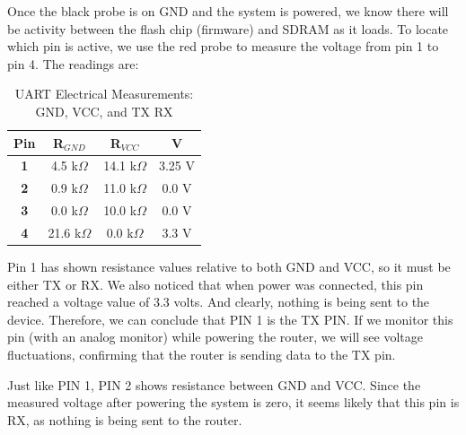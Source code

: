 \documentclass[12pt,a4paper, brazil]{article}
\begin{document}
Once the black probe is on GND and the system is powered, we know there will be activity between the flash chip (firmware) and SDRAM as it loads. To locate which pin is active, we use the red probe to measure the voltage from pin 1 to pin 4. The readings are:

\begin{table}[htpb]
\centering
\caption{UART Electrical Measurements: GND, VCC, and TX RX}
\label{tab:my-table}
\begin{tabular}{@{}cccc@{}}
\toprule
{\color[HTML]{FE0000} \textbf{Pin}} & {\color[HTML]{FE0000} \textbf{R$_{GND}$}}                 & {\color[HTML]{FE0000} \textbf{R$_{VCC}$}}                 & {\color[HTML]{FE0000} \textbf{V}} \\ \midrule
\multicolumn{1}{|c|}{\textbf{1}}    & \multicolumn{1}{c|}{4.5 k$\Omega$}                        & \multicolumn{1}{c|}{14.1 k$\Omega$}                       & \multicolumn{1}{c|}{3.25 V}       \\ \midrule
\multicolumn{1}{|c|}{\textbf{2}}    & \multicolumn{1}{c|}{0.9 k$\Omega$}                        & \multicolumn{1}{c|}{11.0 k$\Omega$}                       & \multicolumn{1}{c|}{0.0 V}        \\ \midrule
\multicolumn{1}{|c|}{\textbf{3}}    & \multicolumn{1}{c|}{{\color[HTML]{FE0000} 0.0 k$\Omega$}} & \multicolumn{1}{c|}{10.0 k$\Omega$}                       & \multicolumn{1}{c|}{0.0 V}        \\ \midrule
\multicolumn{1}{|c|}{\textbf{4}}    & \multicolumn{1}{c|}{21.6 k$\Omega$}                       & \multicolumn{1}{c|}{{\color[HTML]{FE0000} 0.0 k$\Omega$}} & \multicolumn{1}{c|}{3.3 V}        \\ \bottomrule
\end{tabular}
\end{table}

Pin 1 has shown resistance values relative to both GND and VCC, so it must be either TX or RX. We also noticed that when power was connected, this pin reached a voltage value of 3.3 volts. And clearly, nothing is being sent to the device. Therefore, we can conclude that PIN 1 is the TX PIN. If we monitor this pin (with an analog monitor) while powering the router, we will see voltage fluctuations, confirming that the router is sending data to the TX pin.

Just like PIN 1, PIN 2 shows resistance between GND and VCC. Since the measured voltage after powering the system is zero, it seems likely that this pin is RX, as nothing is being sent to the router.
\end{document}
